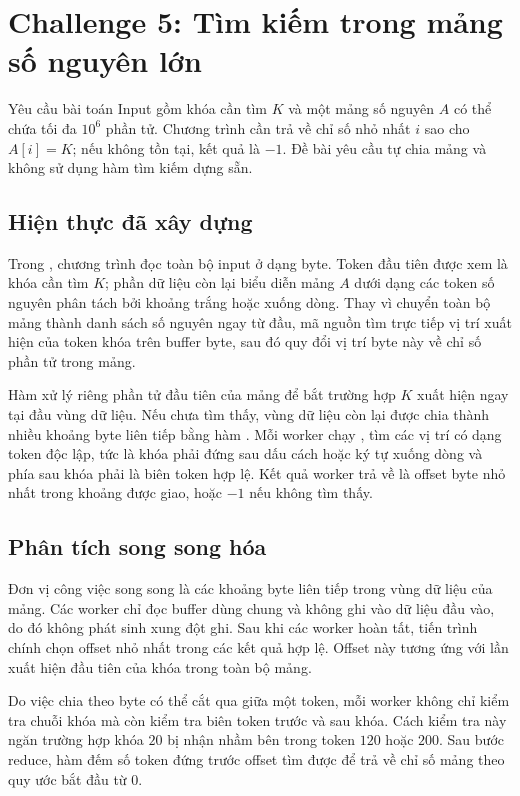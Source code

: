 \section{Challenge 5: Tìm kiếm trong mảng số nguyên lớn}
\label{sec:challenge5}

\begin{requirementbox}{Yêu cầu bài toán}
Input gồm khóa cần tìm $K$ và một mảng số nguyên $A$ có thể chứa tối đa $10^6$ phần tử. Chương trình cần trả về chỉ số nhỏ nhất $i$ sao cho $A[i] = K$; nếu không tồn tại, kết quả là $-1$. Đề bài yêu cầu tự chia mảng và không sử dụng hàm tìm kiếm dựng sẵn.
\end{requirementbox}

\subsection{Hiện thực đã xây dựng}
Trong , chương trình đọc toàn bộ input ở dạng byte. Token đầu tiên được xem là khóa cần tìm $K$; phần dữ liệu còn lại biểu diễn mảng $A$ dưới dạng các token số nguyên phân tách bởi khoảng trắng hoặc xuống dòng. Thay vì chuyển toàn bộ mảng thành danh sách số nguyên ngay từ đầu, mã nguồn tìm trực tiếp vị trí xuất hiện của token khóa trên buffer byte, sau đó quy đổi vị trí byte này về chỉ số phần tử trong mảng.

Hàm  xử lý riêng phần tử đầu tiên của mảng để bắt trường hợp $K$ xuất hiện ngay tại đầu vùng dữ liệu. Nếu chưa tìm thấy, vùng dữ liệu còn lại được chia thành nhiều khoảng byte liên tiếp bằng hàm . Mỗi worker chạy , tìm các vị trí có dạng token độc lập, tức là khóa phải đứng sau dấu cách hoặc ký tự xuống dòng và phía sau khóa phải là biên token hợp lệ. Kết quả worker trả về là offset byte nhỏ nhất trong khoảng được giao, hoặc $-1$ nếu không tìm thấy.

\subsection{Phân tích song song hóa}
Đơn vị công việc song song là các khoảng byte liên tiếp trong vùng dữ liệu của mảng. Các worker chỉ đọc buffer dùng chung và không ghi vào dữ liệu đầu vào, do đó không phát sinh xung đột ghi. Sau khi các worker hoàn tất, tiến trình chính chọn offset nhỏ nhất trong các kết quả hợp lệ. Offset này tương ứng với lần xuất hiện đầu tiên của khóa trong toàn bộ mảng.

Do việc chia theo byte có thể cắt qua giữa một token, mỗi worker không chỉ kiểm tra chuỗi khóa mà còn kiểm tra biên token trước và sau khóa. Cách kiểm tra này ngăn trường hợp khóa $20$ bị nhận nhầm bên trong token $120$ hoặc $200$. Sau bước reduce, hàm  đếm số token đứng trước offset tìm được để trả về chỉ số mảng theo quy ước bắt đầu từ 0.


